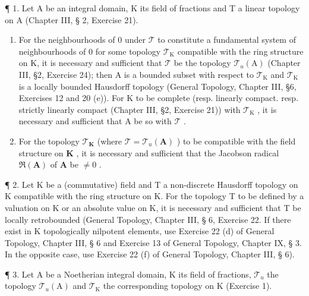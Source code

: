 
¶ 1. Let A be an integral domain, K its field of fractions and T a linear topology on A (Chapter III, § 2, Exercise 21).

\begin{enumerate}
\def\labelenumi{(\alph{enumi})}
\item
  For the neighbourhoods of 0 under \(\mathcal{T}\) to constitute a fundamental system of neighbourhoods of 0 for some topology \(\mathcal{T}_{\mathrm{K}}\) compatible with the ring structure on K, it is necessary and sufficient that \(\mathcal{T}\) be the topology \(\mathcal{T}_{u}(\mathrm{A})\) (Chapter III, §2, Exercise 24); then A is a bounded subset with respect to \(\mathcal{T}_{\mathrm{K}}\) and \(\mathcal{T}_{\mathrm{K}}\) is a locally bounded Hausdorff topology (General Topology, Chapter III, §6, Exercises 12 and 20 (e)). For K to be complete (resp. linearly compact. resp. strictly linearly compact (Chapter III, §2, Exercise 21)) with \(\mathcal{T}_{\mathrm{K}}\) , it is necessary and sufficient that A be so with \(\mathcal{T}\) .
\item
  For the topology \(\mathcal{T}_{\mathbf{K}}\) (where \(\mathcal{T} = \mathcal{T}_u(\mathbf{A})\) ) to be compatible with the field structure on \(\mathbf{K}\) , it is necessary and sufficient that the Jacobson radical \(\Re(\mathbf{A})\) of \(\mathbf{A}\) be \(\neq 0\) .
\end{enumerate}

¶ 2. Let K be a (commutative) field and T a non-discrete Hausdorff topology on K compatible with the ring structure on K. For the topology T to be defined by a valuation on K or an absolute value on K, it is necessary and sufficient that T be locally retrobounded (General Topology, Chapter III, § 6, Exercise 22. If there exist in K topologically nilpotent elements, use Exercise 22 (d) of General Topology, Chapter III, § 6 and Exercise 13 of General Topology, Chapter IX, § 3. In the opposite case, use Exercise 22 (f) of General Topology, Chapter III, § 6).

¶ 3. Let A be a Noetherian integral domain, K its field of fractions, \(\mathcal{T}_{u}\) the topology \(\mathcal{T}_{u}(\mathrm{A})\) and \(\mathcal{T}_{\mathrm{K}}\) the corresponding topology on K (Exercise 1).

